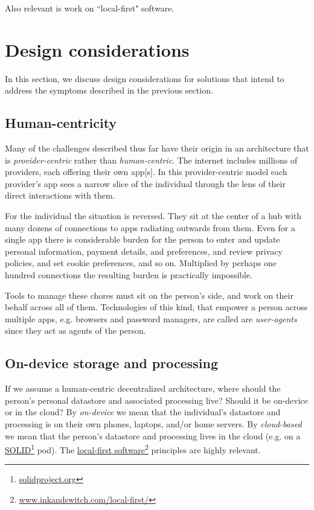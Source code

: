 \documentclass[11pt, oneside]{article}   	%
\newcommand{\hyperfootnote}[1][]{\def\ArgI{{#1}}\hyperfootnoteRelay}
\newcommand\hyperfootnoteRelay[2][]{\href{#1#2}{\ArgI}\footnote{\href{#1#2}{#2}}}
\begin{document}
Also relevant is work on ``local-first" software.\cite{Kleppmann2019}

\section{Design considerations} %

In this section, we discuss design considerations for solutions that intend to address the symptoms described in the previous section.

\subsection{Human-centricity}

Many of the challenges described thus far have their origin in an architecture that is \emph{provider-centric} rather than \emph{human-centric}. The internet includes millions of providers, each offering their own app[s]. In this provider-centric model each provider's app sees a narrow slice of the individual through the lens of their direct interactions with them. 

For the individual the situation is reversed. They sit at the center of a hub with many dozens of connections to apps radiating outwards from them. Even for a single app there is considerable burden for the person to enter and update personal information, payment details, and preferences, and review privacy policies, and set cookie preferences, and so on. Multiplied by perhaps one hundred connections the resulting burden is practically impossible. 

Tools to manage these chores must sit on the person's side, and work on their behalf across all of them. Technologies of this kind, that empower a person across multiple apps, e.g. browsers and password managers, are called are \emph{user-agents} since they act as agents of the person. 

\subsection{On-device storage and processing}
If we assume a human-centric decentralized architecture, where should the person's personal datastore and associated processing live? Should it be on-device or in the cloud? By \emph{on-device} we mean that the individual's datastore and processing is on their own phones, laptops, and/or home servers. By \emph{cloud-based} we mean that the person's datastore and processing lives in the cloud (e.g. on a \hyperfootnote[SOLID][https://]{solidproject.org} pod). The \hyperfootnote[local-first software][https://]{www.inkandswitch.com/local-first/} principles are highly relevant.
\end{document}
